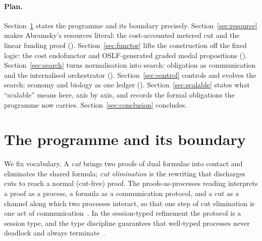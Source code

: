 \documentclass[11pt]{article}
\theoremstyle{definition}
\theoremstyle{plain}
\begin{document}
\paragraph{Plan.} Section~\ref{sec:programme} states the programme and its
boundary precisely. Section~\ref{sec:resource} makes Abramsky's resources
literal: the cost-accounted metered cut and the linear funding proof
(\cite{NoteI}). Section~\ref{sec:functor} lifts the construction off the fixed
logic: the cost endofunctor and OSLF-generated graded modal propositions
(\cite{NoteII}). Section~\ref{sec:search} turns normalisation into search:
obligation as communication and the internalised orchestrator (\cite{NoteIV}).
Section~\ref{sec:control} controls and evolves the search: economy and biology
as one ledger (\cite{NoteIII,NoteIV}). Section~\ref{sec:scalable} states what
``scalable'' means here, axis by axis, and records the formal obligations the
programme now carries. Section~\ref{sec:conclusion} concludes.

\section{The programme and its boundary}\label{sec:programme}

We fix vocabulary. A \emph{cut} brings two proofs of dual formulae into contact
and eliminates the shared formula; \emph{cut elimination} is the rewriting that
discharges cuts to reach a normal (cut-free) proof. The proofs-as-processes
reading interprets a proof as a process, a formula as a communication protocol,
and a cut as a channel along which two processes interact, so that one step of
cut elimination is one act of communication~\cite{Abramsky93,BellinScott94}. In
the session-typed refinement the protocol is a session type, and the type
discipline guarantees that well-typed processes never deadlock and always
terminate~\cite{CairesPfenning10,Wadler14}.
\end{document}
